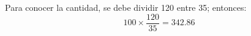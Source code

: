 \documentclass[12pt,addpoints]{evalua}
\begin{document}
\begin{questions}
\begin{parts}
\begin{multicols}{2}
            \begin{solutionbox}{2.8cm}
                Para conocer la cantidad, se debe dividir 120 entre 35; entonces:
                \[100\times\dfrac{120}{35}=342.86\]
            \end{solutionbox}

        \end{multicols}

    \end{parts}








\end{questions}
\end{document}
